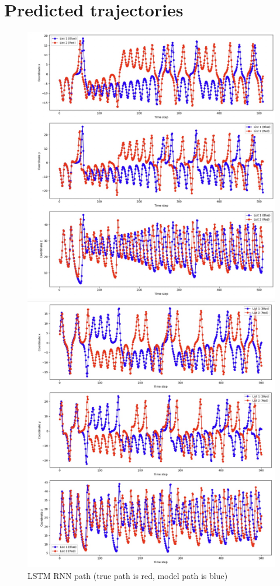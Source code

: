 \documentclass[11pt]{article}
\begin{document}
\section{Predicted trajectories}
\newpage
\begin{figure}
    \centering
    \begin{minipage}[b]{0.49\textwidth}
        \includegraphics[width=\linewidth]{rnn_path.jpeg}
        \caption{LSTM RNN path (true path is red, model path is blue)}
        \label{fig:rnn_path}
    \end{minipage}
    \hfill
    \begin{minipage}[b]{0.49\textwidth}
        \includegraphics[width=\linewidth]{echo_path.jpeg}

\end{minipage}
\end{figure}
\end{document}
